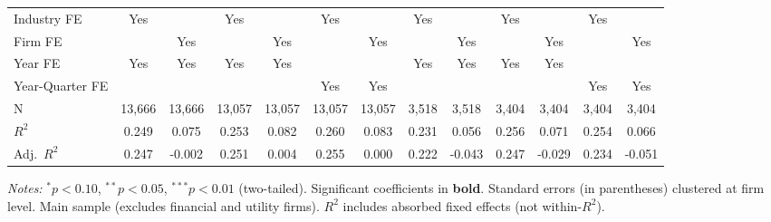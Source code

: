 \begin{landscape}
\begin{table}[H]
\begin{tabular}{lcccccccccccc}
Industry FE & Yes &  & Yes &  & Yes &  & Yes &  & Yes &  & Yes &  \\
Firm FE &  & Yes &  & Yes &  & Yes &  & Yes &  & Yes &  & Yes \\
Year FE & Yes & Yes & Yes & Yes &  &  & Yes & Yes & Yes & Yes &  &  \\
Year-Quarter FE &  &  &  &  & Yes & Yes &  &  &  &  & Yes & Yes \\
\midrule
N & 13,666 & 13,666 & 13,057 & 13,057 & 13,057 & 13,057 & 3,518 & 3,518 & 3,404 & 3,404 & 3,404 & 3,404 \\
$R^2$ & 0.249 & 0.075 & 0.253 & 0.082 & 0.260 & 0.083 & 0.231 & 0.056 & 0.256 & 0.071 & 0.254 & 0.066 \\
Adj.~$R^2$ & 0.247 & -0.002 & 0.251 & 0.004 & 0.255 & 0.000 & 0.222 & -0.043 & 0.247 & -0.029 & 0.234 & -0.051 \\
\bottomrule
\end{tabular}
\begin{minipage}{\linewidth}
\vspace{2pt}\scriptsize
\textit{Notes:} $^{*}p<0.10$, $^{**}p<0.05$, $^{***}p<0.01$ (two-tailed).
 Significant coefficients in \textbf{bold}.
 Standard errors (in parentheses) clustered at firm level.
 Main sample (excludes financial and utility firms).
 $R^2$ includes absorbed fixed effects (not within-$R^2$).
\end{minipage}
\end{table}
\end{landscape}
